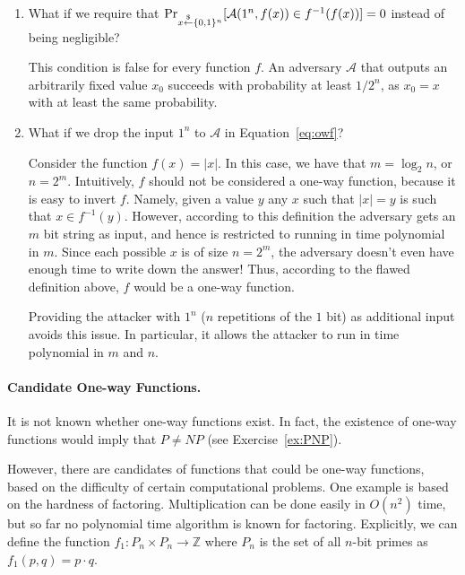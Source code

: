 \begin{enumerate}
\item What if we require that
    $\Pr_{x \stackrel{\$}{\leftarrow} \{0,1\}^{n}}[ \mathcal{A}(1^n, f(x)) \in f^{-1}(f(x))] = 0$ instead of being negligible?

This condition is false for every function $f$. An adversary $\mathcal{A}$ that outputs an arbitrarily fixed value $x_0$ succeeds with probability at least $1/2^{n}$, as $x_0 = x$ with at least the same probability.

\item  What if we drop the input $1^n$ to $\mathcal{A}$ in Equation~\ref{eq:owf}?

Consider the function $f(x) = |x|$.  In this case, we have that $m = \log_2 n$, or $n = 2^m$.  Intuitively, $f$ should not be considered a one-way function, because it is easy to invert $f$. Namely, given a value $y$ any $x$ such that $|x| = y$ is such that $x \in f^{-1}(y)$.  However, according to this definition the adversary gets an $m$ bit string as input, and hence is restricted to running in time polynomial in $m$. Since each possible $x$ is of size $n = 2^m$, the adversary doesn't even have enough time to write down the answer!  Thus, according to the flawed definition above, $f$ would be a one-way function.

Providing the attacker with $1^n$ ($n$ repetitions of the $1$ bit) as additional input avoids this issue.  In particular, it allows the attacker to run in time polynomial in $m$ and $n$.
\end{enumerate}

\paragraph{Candidate One-way Functions.}
It is not known whether one-way functions exist. In fact, the existence of one-way functions would imply that $P \neq NP$ (see Exercise~\ref{ex:PNP}). 

However, there are candidates of functions that could be one-way functions, based on the difficulty of certain computational problems. One example is based on the hardness of factoring. Multiplication can be done easily in $O(n^2)$ time, but so far no polynomial time algorithm is known for factoring.
Explicitly, we can define the function $f_1 : P_n \times P_n \rightarrow \mathbb{Z}$ where $P_n$ is the set of all $n$-bit primes as $f_1(p, q) = p \cdot q$.


